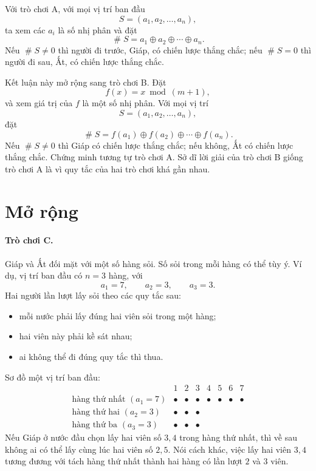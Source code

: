 \documentclass[11pt]{article}
\newcommand{\nimadd}{\oplus}
\newcommand{\val}[1]{\mathop{\#}\!#1}
\begin{document}
Với trò chơi A, với mọi vị trí ban đầu
\[
  S=(a_1,a_2,\ldots,a_n),
\]
ta xem các \(a_i\) là số nhị phân và đặt
\[
  \val{S}=a_1\nimadd a_2\nimadd\cdots\nimadd a_n.
\]
Nếu \(\val{S}\ne0\) thì người đi trước, Giáp, có chiến lược thắng chắc; nếu
\(\val{S}=0\) thì người đi sau, Ất, có chiến lược thắng chắc.

Kết luận này mở rộng sang trò chơi B. Đặt
\[
  f(x)=x\bmod(m+1),
\]
và xem giá trị của \(f\) là một số nhị phân. Với mọi vị trí
\[
  S=(a_1,a_2,\ldots,a_n),
\]
đặt
\[
  \val{S}=f(a_1)\nimadd f(a_2)\nimadd\cdots\nimadd f(a_n).
\]
Nếu \(\val{S}\ne0\) thì Giáp có chiến lược thắng chắc; nếu không, Ất có
chiến lược thắng chắc. Chứng minh tương tự trò chơi A. Sở dĩ lời giải của
trò chơi B giống trò chơi A là vì quy tắc của hai trò chơi khá gần nhau.

\section{Mở rộng}

\paragraph{Trò chơi C.}
Giáp và Ất đối mặt với một số hàng sỏi. Số sỏi trong mỗi hàng có thể tùy ý.
Ví dụ, vị trí ban đầu có \(n=3\) hàng, với
\[
  a_1=7,\qquad a_2=3,\qquad a_3=3.
\]
Hai người lần lượt lấy sỏi theo các quy tắc sau:
\begin{itemize}
  \item mỗi nước phải lấy đúng hai viên sỏi trong một hàng;
  \item hai viên này phải kề sát nhau;
  \item ai không thể đi đúng quy tắc thì thua.
\end{itemize}

Sơ đồ một vị trí ban đầu:
\[
\begin{array}{c|ccccccc}
&1&2&3&4&5&6&7\\ \hline
\text{hàng thứ nhất }(a_1=7)&\bullet&\bullet&\bullet&\bullet&\bullet&\bullet&\bullet\\
\text{hàng thứ hai }(a_2=3)&\bullet&\bullet&\bullet&&&&\\
\text{hàng thứ ba }(a_3=3)&\bullet&\bullet&\bullet&&&&
\end{array}
\]
Nếu Giáp ở nước đầu chọn lấy hai viên số \(3,4\) trong hàng thứ nhất, thì về
sau không ai có thể lấy cùng lúc hai viên số \(2,5\). Nói cách khác, việc
lấy hai viên \(3,4\) tương đương với tách hàng thứ nhất thành hai hàng có
lần lượt \(2\) và \(3\) viên.
\end{document}
